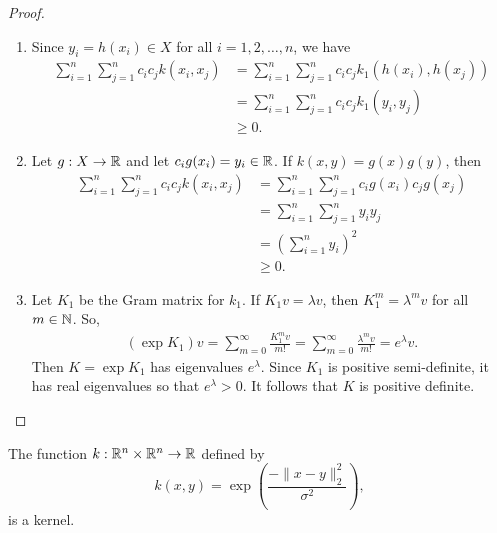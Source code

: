 \begin{proof}
\begin{enumerate}
        \item Since \(y_i = h(x_i) \in X\) for all \(i = 1,2,\dots, n\), we have
        \begin{align*}
            \sum_{i=1}^{n} \sum_{j=1}^{n} c_i c_j k(x_i,x_j)
            &= \sum_{i=1}^{n} \sum_{j=1}^{n} c_i c_j k_1(h(x_i), h(x_j))\\
            &= \sum_{i=1}^{n} \sum_{j=1}^{n} c_i c_j k_1(y_i, y_j)\\
            &\geq 0.
        \end{align*}
        \item Let \(g : X \to \mathbb{R}\) and let \(c_i g(x_i) = y_i \in \mathbb{R}\).
        If \(k(x,y) = g(x)g(y)\), then
        \begin{align*}
            \sum_{i=1}^{n} \sum_{j=1}^{n} c_i c_j k(x_i,x_j)
            &= \sum_{i=1}^{n} \sum_{j=1}^{n} c_i g(x_i) c_j g(x_j)\\
            &= \sum_{i=1}^{n} \sum_{j=1}^{n} y_i y_j\\
            &= \left(\sum_{i=1}^{n} y_i\right)^2\\
            &\geq 0.
        \end{align*}
        \item Let \(K_1\) be the Gram matrix for \(k_1\).
        If \(K_1 v = \lambda v\), then \(K_1^m = \lambda^m v\) for all \(m \in \mathbb{N}\).
        So,
        \begin{align*}
            (\exp K_1) v
            = \sum_{m=0}^{\infty} \frac{K_1^m v}{m!}
            = \sum_{m=0}^{\infty} \frac{\lambda^m v}{m!}
            = e^\lambda v.
        \end{align*}
        Then \(K = \exp K_1\) has eigenvalues \(e^\lambda\).
        Since \(K_1\) is positive semi-definite, it has real eigenvalues so that \(e^\lambda > 0\).
        It follows that \(K\) is positive definite.
    \end{enumerate}
\end{proof}

\begin{theorem}
    The function \(k : \mathbb{R}^n \times \mathbb{R}^n \to \mathbb{R}\) defined by
    \[k(x,y) = \exp\left(\dfrac{-\|x-y\|^2_2}{\sigma^2}\right),\]
    is a kernel.
\end{theorem}